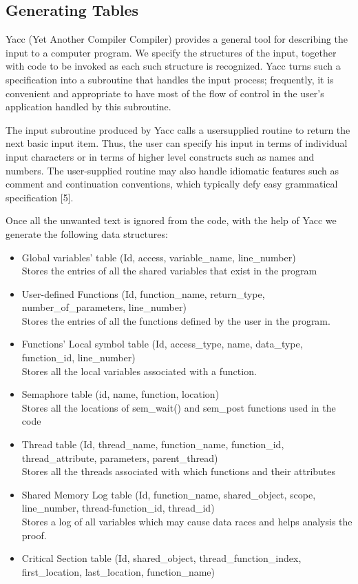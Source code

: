 \subsection{Generating Tables}
Yacc (Yet Another Compiler Compiler) provides a general tool for describing the input to a computer program. We specify the structures of the input, together with code to be invoked as each such structure is recognized. Yacc turns such a specification into a subroutine that handles the input process; frequently, it is convenient and appropriate to have most of the flow of control in the user's application handled by this subroutine.

The input subroutine produced by Yacc calls a usersupplied routine to return the next basic input item. Thus, the user can specify his input in terms of individual input characters or in terms of higher level constructs such as names and numbers. The user-supplied routine may also handle idiomatic features such as comment and continuation conventions, which typically defy easy grammatical specification [5]. 

Once all the unwanted text is ignored from the code, with the help of Yacc we generate the following data structures:

\begin{itemize}
\item Global variables’ table (Id, access, variable\_name, line\_number)\\
Stores the entries of all the shared variables that exist in the program

\item User-defined Functions (Id, function\_name, return\_type, number\_of\_parameters, line\_number)\\
Stores the entries of all the functions defined by the user in the program.

\item Functions’ Local symbol table (Id, access\_type, name, data\_type, function\_id, line\_number)\\
Stores all the local variables associated with a function.

\item Semaphore table (id, name, function, location)\\
Stores all the locations of sem\_wait() and sem\_post functions used in the code

\item Thread table (Id, thread\_name, function\_name, function\_id, thread\_attribute, parameters, parent\_thread)\\
Stores all the threads associated with which functions and their attributes

\item Shared Memory Log table (Id, function\_name, shared\_object, scope, line\_number, thread-function\_id, thread\_id)\\
Stores a log of all variables which may cause data races and helps analysis the proof.

\item Critical Section table (Id, shared\_object, thread\_function\_index, first\_location, last\_location, function\_name)

\end{itemize}

